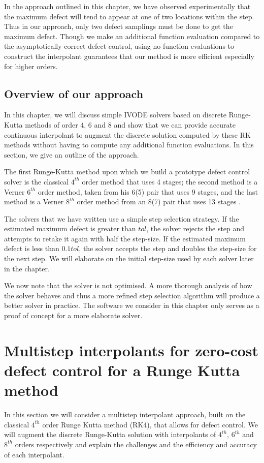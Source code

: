 In the approach outlined in this chapter, we have observed experimentally that the maximum defect will tend to appear at one of two locations within the step. Thus in our approach, only two defect samplings must be done to get the maximum defect. Though we make an additional function evaluation compared to the asymptotically correct defect control, using no function evaluations to construct the interpolant guarantees that our method is more efficient especially for higher orders.


\subsection{Overview of our approach}
\label{section:basic_runge_kutta}
In this chapter, we will discuss simple IVODE solvers based on discrete Runge-Kutta methods of order 4, 6 and 8 and show that we can provide accurate continuous interpolant to augment the discrete solution computed by these RK methods without having to compute any additional function evaluations. In this section, we give an outline of the approach.

The first Runge-Kutta method upon which we build a prototype defect control solver is the classical $4^{th}$ order method that uses 4 stages; the second method is a Verner $6^{th}$ order method, taken from his 6(5) pair \cite{JimVernerRepo} that uses 9 stages, and the last method is a Verner $8^{th}$ order method from an 8(7) pair that uses 13 stages \cite{MR1239829}. 

The solvers that we have written use a simple step selection strategy. If the estimated maximum defect is greater than $tol$, the solver rejects the step and attempts to retake it again with half the step-size. If the estimated maximum defect is less than $0.1tol$, the solver accepts the step and doubles the step-size for the next step. We will elaborate on the initial step-size used by each solver later in the chapter.

We now note that the solver is not optimised. A more thorough analysis of how the solver behaves and thus a more refined step selection algorithm will produce a better solver in practice. The software we consider in this chapter only serves as a proof of concept for a more elaborate solver. 

\section{Multistep interpolants for zero-cost defect control for a Runge Kutta method}
\label{section:equipping_rk4_with_HBs}
In this section we will consider a multistep interpolant approach, built on the classical $4^{th}$ order Runge Kutta method (RK4), that allows for defect control. We will augment the discrete Runge-Kutta solution with interpolants of $4^{th}$, $6^{th}$ and $8^{th}$ orders respectively and explain the challenges and the efficiency and accuracy of each interpolant. 

